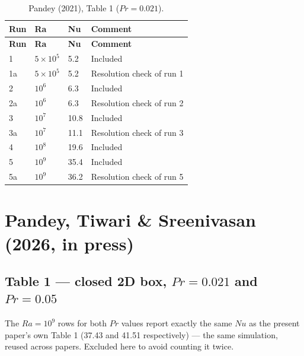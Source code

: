 \documentclass[11pt]{article}
\begin{document}
\begin{longtable}{l l l l}
\caption{Pandey (2021), Table 1 ($Pr=0.021$).}\label{tab:pandey2021}\\
\toprule
\textbf{Run} & \textbf{Ra} & \textbf{Nu} & \textbf{Comment} \\
\midrule
\endfirsthead
\toprule
\textbf{Run} & \textbf{Ra} & \textbf{Nu} & \textbf{Comment} \\
\midrule
\endhead
\bottomrule
\endfoot
\rowcolor{included} 1 & $5\times10^{5}$ & 5.2 & Included \\
\rowcolor{excluded} 1a & $5\times10^{5}$ & 5.2 & Resolution check of run 1 \\
\rowcolor{included} 2 & $10^{6}$ & 6.3 & Included \\
\rowcolor{excluded} 2a & $10^{6}$ & 6.3 & Resolution check of run 2 \\
\rowcolor{included} 3 & $10^{7}$ & 10.8 & Included \\
\rowcolor{excluded} 3a & $10^{7}$ & 11.1 & Resolution check of run 3 \\
\rowcolor{included} 4 & $10^{8}$ & 19.6 & Included \\
\rowcolor{included} 5 & $10^{9}$ & 35.4 & Included \\
\rowcolor{excluded} 5a & $10^{9}$ & 36.2 & Resolution check of run 5 \\
\end{longtable}
\section{Pandey, Tiwari \& Sreenivasan (2026, in press)}
\subsection*{Table 1 --- closed 2D box, $Pr=0.021$ and $Pr=0.05$}
The $Ra=10^9$ rows for both $Pr$ values report exactly the same $Nu$
as the present paper's own Table 1 (37.43 and 41.51 respectively) --- the
same simulation, reused across papers. Excluded here to avoid counting it
twice.
\end{document}
